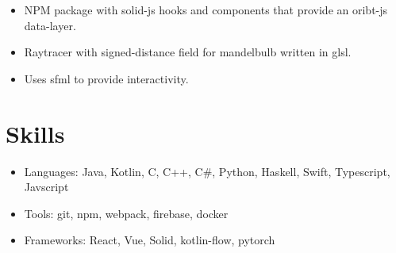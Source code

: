 \documentclass[11pt, a4paper]{article}
\begin{document}
\noindent
{
  \hfill
}
\vspace{-0.1in}
\begin{itemize}
  \item NPM package with solid-js hooks and components that provide an oribt-js data-layer.
\end{itemize}
\vspace{-0.05in}

\noindent
{
  \hfill
}
\vspace{-0.1in}
\begin{itemize}
  \item Raytracer with signed-distance field for mandelbulb written in glsl.
        \vspace{-0.1in}
  \item Uses sfml to provide interactivity.
\end{itemize}

\vspace{-0.2in}

\section*{Skills}
\begin{itemize}
  \item Languages: Java, Kotlin, C, C++, C\#, Python, Haskell, Swift, Typescript, Javscript
        \vspace{-0.1in}
  \item Tools: git, npm, webpack, firebase, docker
        \vspace{-0.1in}
  \item Frameworks: React, Vue, Solid, kotlin-flow, pytorch
\end{itemize}
\end{document}
